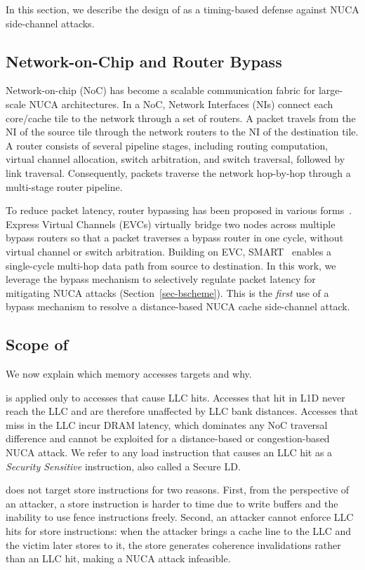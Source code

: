 In this section, we describe the design of \scheme{} as a timing-based defense against NUCA side-channel attacks.

\subsection{Network-on-Chip and Router Bypass} \label{sec-noc-background}
Network-on-chip (NoC) has become a scalable communication fabric for large-scale NUCA architectures.
In a NoC, Network Interfaces (NIs) connect each core/cache tile to the network through a set of routers.
A packet travels from the NI of the source tile through the network routers to the NI of the destination tile.
A router consists of several pipeline stages, including routing computation, virtual channel allocation, switch arbitration, and switch traversal, followed by link traversal.
Consequently, packets traverse the network hop-by-hop through a multi-stage router pipeline.

To reduce packet latency, router bypassing has been proposed in various forms~\cite{krishna2013breaking}.
Express Virtual Channels (EVCs) virtually bridge two nodes across multiple bypass routers so that a packet traverses a bypass router in one cycle, without virtual channel or switch arbitration.
Building on EVC, SMART~\cite{krishna2013breaking} enables a single-cycle multi-hop data path from source to destination.
In this work, we leverage the bypass mechanism to selectively regulate packet latency for mitigating NUCA attacks (Section~\ref{sec-bscheme}).
This is the \emph{first} use of a bypass mechanism to resolve a distance-based NUCA cache side-channel attack.

\subsection{Scope of \scheme} \label{sec-scope}
We now explain which memory accesses \scheme{} targets and why.

\scheme{} is applied only to accesses that cause LLC hits.
Accesses that hit in L1D never reach the LLC and are therefore unaffected by LLC bank distances.
Accesses that miss in the LLC incur DRAM latency, which dominates any NoC traversal difference and cannot be exploited for a distance-based or congestion-based NUCA attack.
We refer to any load instruction that causes an LLC hit as a \emph{Security Sensitive} instruction, also called a Secure LD.

\scheme{} does not target store instructions for two reasons.
First, from the perspective of an attacker, a store instruction is harder to time due to write buffers and the inability to use fence instructions freely.
Second, an attacker cannot enforce LLC hits for store instructions: when the attacker brings a cache line to the LLC and the victim later stores to it, the store generates coherence invalidations rather than an LLC hit, making a NUCA attack infeasible.

